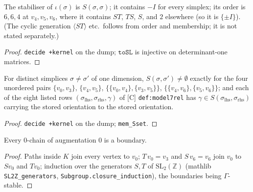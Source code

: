\begin{proposition}\label{prop:model7h4-iv}
  \leanok
  The stabiliser of $\iota(\sigma)$ is $S(\sigma,\sigma)$; it contains $-I$ for every simplex; its order is $6,6,4$ at
  $v_4,v_5,v_6$, where it contains $ST$, $TS$, $S$, and $2$ elsewhere (so it is $\{\pm I\}$). (The cyclic generation
  $\langle ST\rangle$ etc.\ follows from order and membership; it is not stated separately.)
\end{proposition}
\begin{proof}
  \leanok
  \texttt{decide +kernel} on the dump; $\mathtt{toSL}$ is injective on determinant-one matrices.
\end{proof}

\begin{proposition}\label{prop:model7coincidences-2}
  \leanok
  For distinct simplices $\sigma\neq\sigma'$ of one dimension, $S(\sigma,\sigma')\neq\emptyset$ exactly for the four
  unordered pairs $\{v_0,v_3\}$, $\{v_4,v_5\}$, $\{\{v_0,v_4\},\{v_3,v_5\}\}$, $\{\{v_4,v_6\},\{v_5,v_6\}\}$; and each of
  the eight listed rows $(\sigma_{\mathrm{lhs}},\sigma_{\mathrm{rhs}},\gamma)$ of [C] \texttt{def:model7rel} has
  $\gamma\in S(\sigma_{\mathrm{lhs}},\sigma_{\mathrm{rhs}})$ carrying the stored orientation to the stored orientation.
\end{proposition}
\begin{proof}
  \leanok
  \texttt{decide +kernel} on the dump; \texttt{mem\_Sset}.
\end{proof}

\begin{lemma}\label{prop:model7h4-ii-0}
  \leanok
  Every $0$-chain of augmentation $0$ is a boundary.
\end{lemma}
\begin{proof}
  \leanok
  Paths inside $K$ join every vertex to $v_0$; $T\,v_0=v_3$ and $S\,v_6=v_6$ join $v_0$ to $Sv_0$ and $Tv_0$; induction over
  the generators $S,T$ of $\mathrm{SL}_2(\mathbb Z)$ (mathlib \texttt{SL2Z\_generators}, \texttt{Subgroup.closure\_induction}),
  the boundaries being $\Gamma$-stable.
\end{proof}


